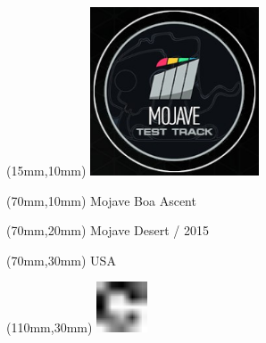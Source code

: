 \null\newpage
\begin{textblock*}{50mm}(15mm,10mm)%
\includegraphics[width=50mm]{LG/MOJA.png}
\end{textblock*}
\begin{textblock*}{130mm}(70mm,10mm)%
{\fontsize{20}{20}\selectfont Mojave Boa Ascent}\\
\end{textblock*}
\begin{textblock*}{120mm}(70mm,20mm)%
{\fontsize{16}{16}\selectfont Mojave Desert / 2015}\\
\end{textblock*}
\begin{textblock*}{120mm}(70mm,30mm)%
{\fontsize{12}{12}\selectfont USA}
\end{textblock*}
\begin{textblock*}{30mm}(110mm,30mm)%
\centering
\includegraphics[height=15mm]{icons/fa-rotate-right.pdf}
\end{textblock*}
